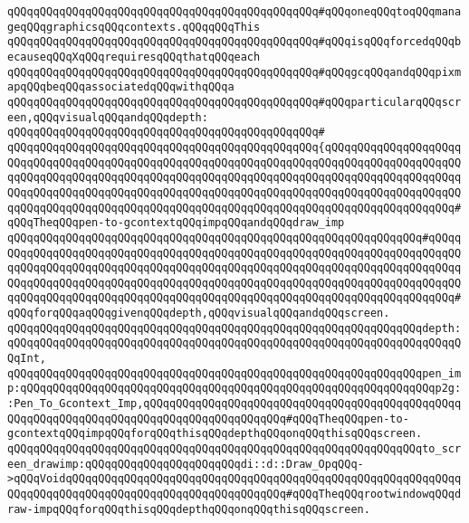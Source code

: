 \verb|qQQqqQQqqQQqqQQqqQQqqQQqqQQqqQQqqQQqqQQqqQQqqQQq#qQQqoneqQQqtoqQQqmanageqQQqgraphicsqQQqcontexts.qQQqqQQqThis|\newline
\verb|qQQqqQQqqQQqqQQqqQQqqQQqqQQqqQQqqQQqqQQqqQQqqQQq#qQQqisqQQqforcedqQQqbecauseqQQqXqQQqrequiresqQQqthatqQQqeach|\newline
\verb|qQQqqQQqqQQqqQQqqQQqqQQqqQQqqQQqqQQqqQQqqQQqqQQq#qQQqgcqQQqandqQQqpixmapqQQqbeqQQqassociatedqQQqwithqQQqa|\newline
\verb|qQQqqQQqqQQqqQQqqQQqqQQqqQQqqQQqqQQqqQQqqQQqqQQq#qQQqparticularqQQqscreen,qQQqvisualqQQqandqQQqdepth:|\newline
\verb|qQQqqQQqqQQqqQQqqQQqqQQqqQQqqQQqqQQqqQQqqQQqqQQq#|\newline
\verb|qQQqqQQqqQQqqQQqqQQqqQQqqQQqqQQqqQQqqQQqqQQqqQQq{qQQqqQQqqQQqqQQqqQQqqQQqqQQqqQQqqQQqqQQqqQQqqQQqqQQqqQQqqQQqqQQqqQQqqQQqqQQqqQQqqQQqqQQqqQQqqQQqqQQqqQQqqQQqqQQqqQQqqQQqqQQqqQQqqQQqqQQqqQQqqQQqqQQqqQQqqQQqqQQqqQQqqQQqqQQqqQQqqQQqqQQqqQQqqQQqqQQqqQQqqQQqqQQqqQQqqQQqqQQqqQQqqQQqqQQqqQQqqQQqqQQqqQQqqQQqqQQqqQQqqQQqqQQqqQQqqQQqqQQqqQQqqQQqqQQqqQQqqQQq#qQQqTheqQQqpen-to-gcontextqQQqimpqQQqandqQQqdraw_imp|\newline
\verb|qQQqqQQqqQQqqQQqqQQqqQQqqQQqqQQqqQQqqQQqqQQqqQQqqQQqqQQqqQQqqQQq#qQQqqQQqqQQqqQQqqQQqqQQqqQQqqQQqqQQqqQQqqQQqqQQqqQQqqQQqqQQqqQQqqQQqqQQqqQQqqQQqqQQqqQQqqQQqqQQqqQQqqQQqqQQqqQQqqQQqqQQqqQQqqQQqqQQqqQQqqQQqqQQqqQQqqQQqqQQqqQQqqQQqqQQqqQQqqQQqqQQqqQQqqQQqqQQqqQQqqQQqqQQqqQQqqQQqqQQqqQQqqQQqqQQqqQQqqQQqqQQqqQQqqQQqqQQqqQQqqQQqqQQqqQQqqQQqqQQqqQQqqQQq#qQQqforqQQqaqQQqgivenqQQqdepth,qQQqvisualqQQqandqQQqscreen.|\newline
\verb|qQQqqQQqqQQqqQQqqQQqqQQqqQQqqQQqqQQqqQQqqQQqqQQqqQQqqQQqqQQqqQQqdepth:qQQqqQQqqQQqqQQqqQQqqQQqqQQqqQQqqQQqqQQqqQQqqQQqqQQqqQQqqQQqqQQqqQQqqQQqInt,|\newline
\verb|qQQqqQQqqQQqqQQqqQQqqQQqqQQqqQQqqQQqqQQqqQQqqQQqqQQqqQQqqQQqqQQqpen_imp:qQQqqQQqqQQqqQQqqQQqqQQqqQQqqQQqqQQqqQQqqQQqqQQqqQQqqQQqqQQqqQQqp2g::Pen_To_Gcontext_Imp,qQQqqQQqqQQqqQQqqQQqqQQqqQQqqQQqqQQqqQQqqQQqqQQqqQQqqQQqqQQqqQQqqQQqqQQqqQQqqQQqqQQqqQQqqQQq#qQQqTheqQQqpen-to-gcontextqQQqimpqQQqforqQQqthisqQQqdepthqQQqonqQQqthisqQQqscreen.|\newline
\verb|qQQqqQQqqQQqqQQqqQQqqQQqqQQqqQQqqQQqqQQqqQQqqQQqqQQqqQQqqQQqqQQqto_screen_drawimp:qQQqqQQqqQQqqQQqqQQqqQQqdi::d::Draw_OpqQQq->qQQqVoidqQQqqQQqqQQqqQQqqQQqqQQqqQQqqQQqqQQqqQQqqQQqqQQqqQQqqQQqqQQqqQQqqQQqqQQqqQQqqQQqqQQqqQQqqQQqqQQqqQQqqQQq#qQQqTheqQQqrootwindowqQQqdraw-impqQQqforqQQqthisqQQqdepthqQQqonqQQqthisqQQqscreen.|\newline
